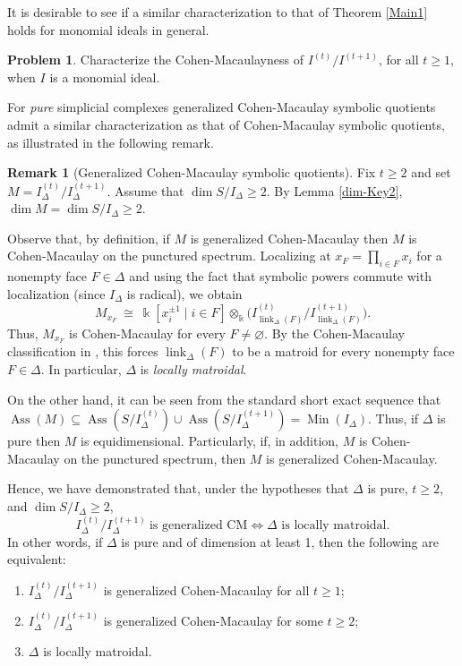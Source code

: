 \documentclass[12pt]{amsart}
\numberwithin{equation}{section}
\theoremstyle{definition}
\newtheorem{prob}[theorem]{Problem}
\theoremstyle{definition}
\newtheorem{remark}[theorem]{Remark}
\DeclareMathOperator{\Ass}{Ass}
\DeclareMathOperator{\Min}{Min}
\DeclareMathOperator{\link}{link}
\def\kk{{\Bbbk}}
\begin{document}
It is desirable to see if a similar characterization to that of Theorem \ref{Main1} holds for monomial ideals in general.

\begin{prob} Characterize the Cohen-Macaulayness of $I^{(t)}/I^{(t+1)}$, for all $t \ge 1$, when $I$ is a monomial ideal.
\end{prob}




For \emph{pure} simplicial complexes generalized Cohen-Macaulay symbolic quotients admit a similar characterization as that of Cohen-Macaulay symbolic quotients, as illustrated in the following remark.

\begin{remark}[Generalized Cohen-Macaulay symbolic quotients] \label{rmk:gCMandB}
	Fix $t \ge 2$ and set $M=I_\Delta^{(t)}/I_\Delta^{(t+1)}$.  Assume that $\dim S/I_\Delta \ge 2$. By Lemma \ref{dim-Key2}, $\dim M = \dim S/I_\Delta \ge 2$.
	
	Observe that, by definition, if $M$ is generalized Cohen-Macaulay then $M$ is Cohen-Macaulay on the punctured spectrum.
	Localizing at $x_F=\prod_{i\in F}x_i$ for a nonempty face $F \in \Delta$ and using the fact that symbolic powers
	commute with localization (since $I_\Delta$ is radical), we obtain
	\[
	M_{x_F}\ \cong\ \kk[x_i^{\pm1}\mid i\in F]\otimes_\kk
	\Big(I_{\link_\Delta(F)}^{(t)}/I_{\link_\Delta(F)}^{(t+1)}\Big).
	\]
	Thus, $M_{x_F}$ is Cohen-Macaulay for every $F \neq \varnothing$. 
	By the Cohen-Macaulay classification in , this forces $\link_\Delta(F)$ to be a matroid for every nonempty face $F \in \Delta$. In particular, $\Delta$ is \emph{locally matroidal}.  
	
	On the other hand, it can be seen from the standard short exact sequence that $\Ass(M) \subseteq \Ass(S/I_\Delta^{(t)}) \cup \Ass(S/I_\Delta^{(t+1)}) = \Min(I_\Delta)$. Thus, if $\Delta$ is pure then $M$ is equidimensional. Particularly, if, in addition, $M$ is Cohen-Macaulay on the punctured spectrum, then $M$ is generalized Cohen-Macaulay. 
	
	Hence, we have demonstrated that, under the hypotheses that $\Delta$ is pure, $t \ge 2$, and $\dim S/I_\Delta \ge 2$,
	$$I_\Delta^{(t)}/I_\Delta^{(t+1)}\ \text{is generalized CM} \Longleftrightarrow \Delta \text{ is locally matroidal.}$$
	In other words, if $\Delta$ is pure and of dimension at least 1, then the following are equivalent:
	\begin{enumerate}
		\item $I_\Delta^{(t)}/I_\Delta^{(t+1)}$ is generalized Cohen-Macaulay for all $t \ge 1$; 
		\item $I_\Delta^{(t)}/I_\Delta^{(t+1)}$ is generalized Cohen-Macaulay for some $t \ge 2$; 
		\item $\Delta$ is locally matroidal.
	\end{enumerate}
\end{remark}
\end{document}
